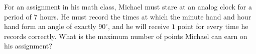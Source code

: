For an assignment in his math class, Michael must stare at an analog clock for a period of $7$ hours. He must record the times at which the minute hand and hour hand form an angle of exactly $90^\circ$, and he will receive $1$ point for every time he records correctly. What is the maximum number of points Michael can earn on his assignment?
